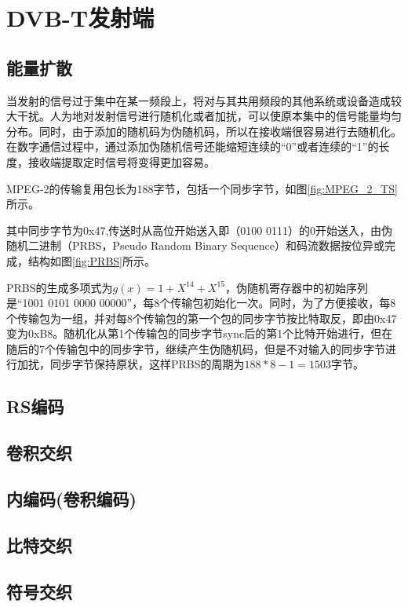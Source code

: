 \chapter{DVB-T发射端}
	\section{能量扩散}
		\par 当发射的信号过于集中在某一频段上，将对与其共用频段的其他系统或设备造成较大干扰。人为地对发射信号进行随机化或者加扰，可以使原本集中的信号能量均匀分布。同时，由于添加的随机码为伪随机码，所以在接收端很容易进行去随机化。在数字通信过程中，通过添加伪随机信号还能缩短连续的“0”或者连续的“1”的长度，接收端提取定时信号将变得更加容易。
		\par MPEG-2的传输复用包长为188字节，包括一个同步字节，如图\ref{fig:MPEG_2_TS}所示。\cite{数字电视DVB标准能量扩散的FPGA设计与实现}
		
		\par 其中同步字节为0x47,传送时从高位开始送入即（0100 0111）的0开始送入，由伪随机二进制（PRBS，Pseudo Random Binary Sequence）和码流数据按位异或完成，结构如图\ref{fig:PRBS}所示。
		
		\par PRBS的生成多项式为$g(x)=1+X^{14}+X^{15}$，伪随机寄存器中的初始序列是“1001 0101 0000 00000”，每8个传输包初始化一次。同时，为了方便接收，每8个传输包为一组，并对每8个传输包的第一个包的同步字节按比特取反，即由0x47变为0xB8。随机化从第1个传输包的同步字节sync后的第1个比特开始进行，但在随后的7个传输包中的同步字节，继续产生伪随机码，但是不对输入的同步字节进行加扰，同步字节保持原状，这样PRBS的周期为$188*8-1=1503$字节。
		
	\section{RS编码}
	\section{卷积交织}
	\section{内编码(卷积编码)}
	\section{比特交织}
	\section{符号交织}
